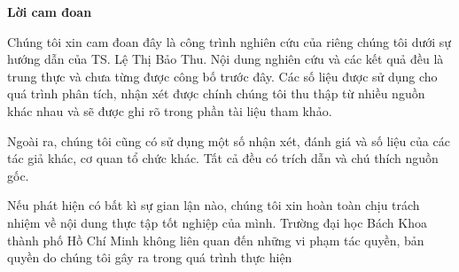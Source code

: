 \centerline{{\bfseries \LARGE Lời cam đoan}}

\bigskip
\bigskip

    Chúng tôi xin cam đoan đây là công trình nghiên cứu của riêng chúng tôi
dưới sự hướng dẫn của TS. Lệ Thị Bảo Thu. Nội dung nghiên cứu và các kết
quả đều là trung thực và chưa từng được công bố trước đây. Các số liệu được sử
dụng cho quá trình phân tích, nhận xét được chính chúng tôi thu thập từ nhiều
nguồn khác nhau và sẽ được ghi rõ trong phần tài liệu tham khảo.\par
Ngoài ra, chúng tôi cũng có sử dụng một số nhận xét, đánh giá và số liệu
của các tác giả khác, cơ quan tổ chức khác. Tất cả đều có trích dẫn và chú thích
nguồn gốc.\par
Nếu phát hiện có bất kì sự gian lận nào, chúng tôi xin hoàn toàn chịu trách
nhiệm về nội dung thực tập tốt nghiệp của mình. Trường đại học Bách Khoa
thành phố Hồ Chí Minh không liên quan đến những vi phạm tác quyền, bản
quyền do chúng tôi gây ra trong quá trình thực hiện
